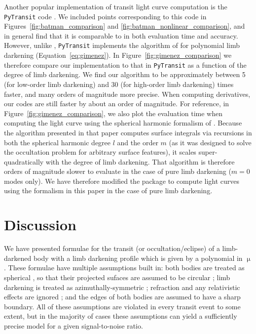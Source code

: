 \documentclass[modern]{aastex61}
\begin{document}
Another popular implementation of transit light curve computation is the
\texttt{PyTransit} code \citep{Parviainen2015b}. We included points corresponding
to this code in Figures~\ref{fig:batman_comparison} and \ref{fig:batman_nonlinear_comparison},
and in general find that it is comparable to \batman in both evaluation time
and accuracy. However, unlike \batman, \texttt{PyTransit} implements the
algorithm of \citet{Gimenez2006} for polynomial limb darkening (Equation~\ref{eq:gimenez}).
In Figure~\ref{fig:gimenez_comparison} we therefore compare our implementation
to that in \texttt{PyTransit} as a function of the degree of limb darkening.
We find our algorithm to be approximately between 5 (for low-order limb darkening)
and 30 (for high-order limb darkening) times faster, and many orders of magnitude
more precise. When computing derivatives, our codes are still faster by about
an order of magnitude. For reference, in Figure~\ref{fig:gimenez_comparison},
we also plot the evaluation time when computing the light curve using the
spherical harmonic formalism of \cite{starry}. Because the algorithm presented
in that paper computes surface integrals via recursions in both the
spherical harmonic degree $l$ and the order $m$ (as it was designed to
solve the occultation problem for arbitrary surface features),
it scales super-quadratically with the degree of limb darkening. That
algorithm is therefore orders of magnitude slower
to evaluate in the case of pure limb darkening ($m=0$ modes only). We have
therefore modified the \starry package to compute light curves
using the formalism in this paper in the case of pure limb darkening.

\section{Discussion}

We have presented formulae for the transit (or occultation/eclipse) of a
limb-darkened body with a limb darkening profile which is given by a polynomial
in $\upmu$.  These formulae have multiple assumptions built in:  both bodies
are treated as spherical \citep[but see][]{Seager2002,Hui2002}, so that their projected
sufaces are assumed to be circular \citep[but see][]{Barnes2003,Barnes2004,Barnes2009b,
DobbsDixon2012};  limb darkening is treated as azimuthally-symmetric \citep[but see][]{Barnes2009a};
refraction and any relativistic effects are ignored \citep[but see][]{Sidis2010};
and the edges of both bodies are assumed to have a sharp boundary.
All of these assumptions are violated in every transit event to some extent,
but in the majority of cases these assumptions can yield a sufficiently precise model for
a given signal-to-noise ratio.
\end{document}
